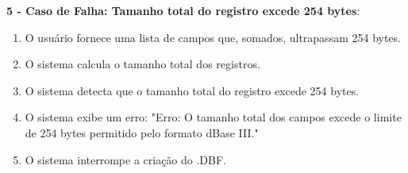 \textbf{5 - Caso de Falha: Tamanho total do registro excede 254 bytes}:
\begin{enumerate}
    \item O usuário fornece uma lista de campos que, somados, ultrapassam 254 bytes.
    \item O sistema calcula o tamanho total dos registros.
    \item O sistema detecta que o tamanho total do registro excede 254 bytes.
    \item O sistema exibe um erro: "Erro: O tamanho total dos campos excede o limite de 254 bytes permitido pelo formato dBase III."
    \item O sistema interrompe a criação do .DBF.
\end{enumerate}
